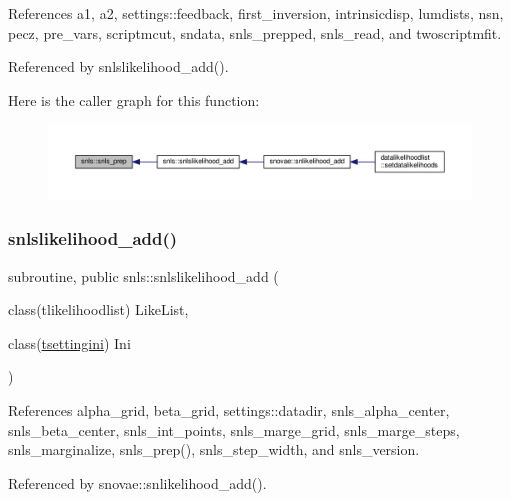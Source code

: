 References a1, a2, settings\+::feedback, first\+\_\+inversion, intrinsicdisp, lumdists, nsn, pecz, pre\+\_\+vars, scriptmcut, sndata, snls\+\_\+prepped, snls\+\_\+read, and twoscriptmfit.



Referenced by snlslikelihood\+\_\+add().

Here is the caller graph for this function\+:
\nopagebreak
\begin{figure}[H]
\begin{center}
\leavevmode
\includegraphics[width=350pt]{namespacesnls_aa7659f323fe80a70e09e7c1b3257cf5b_icgraph}
\end{center}
\end{figure}
\mbox{\label{namespacesnls_a93456d40d3b103bc17faf5bafac66d76}} 
\subsubsection{\texorpdfstring{snlslikelihood\+\_\+add()}{snlslikelihood\_add()}}
{\footnotesize\ttfamily subroutine, public snls\+::snlslikelihood\+\_\+add (\begin{DoxyParamCaption}\item[{class(tlikelihoodlist)}]{Like\+List,  }\item[{class(\mbox{\hyperlink{structsettings_1_1tsettingini}{tsettingini}})}]{Ini }\end{DoxyParamCaption})}



References alpha\+\_\+grid, beta\+\_\+grid, settings\+::datadir, snls\+\_\+alpha\+\_\+center, snls\+\_\+beta\+\_\+center, snls\+\_\+int\+\_\+points, snls\+\_\+marge\+\_\+grid, snls\+\_\+marge\+\_\+steps, snls\+\_\+marginalize, snls\+\_\+prep(), snls\+\_\+step\+\_\+width, and snls\+\_\+version.



Referenced by snovae\+::snlikelihood\+\_\+add().

